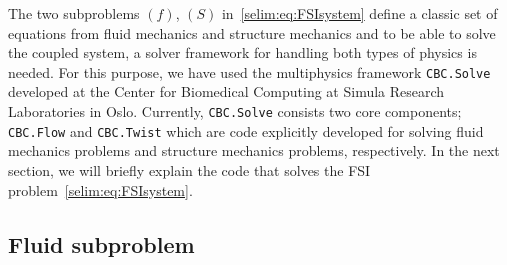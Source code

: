 The two subproblems $(f)$, $(S)$ in~\eqref{selim:eq:FSIsystem} define
a classic set of equations from fluid mechanics and structure
mechanics and to be able to solve the coupled system, a solver
framework for handling both types of physics is needed. For this
purpose, we have used the multiphysics framework \texttt{CBC.Solve}
developed at the Center for Biomedical Computing at Simula Research
Laboratories in Oslo. Currently, \texttt{CBC.Solve} consists two core
components; \texttt{CBC.Flow} and \texttt{CBC.Twist} which are code
explicitly developed for solving fluid mechanics problems and
structure mechanics problems, respectively.  In the next section, we
will briefly explain the code that solves the FSI
problem~\eqref{selim:eq:FSIsystem}.

\subsection{Fluid subproblem}

